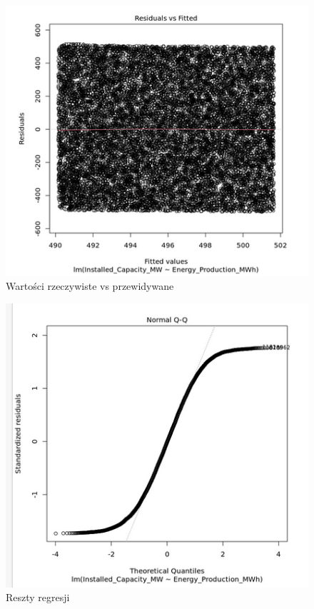 \begin{figure}[H]
    \centering
    \includegraphics[width=0.9\linewidth]{lab1/obraz4.png}
    \caption{Wartości rzeczywiste vs przewidywane}
    \label{fig:real_vs_predicted}
\end{figure}

\begin{figure}[H]
    \centering
    \includegraphics[width=0.9\linewidth]{lab1/obraz5.png}
    \caption{Reszty regresji}
    \label{fig:residuals}
\end{figure}


